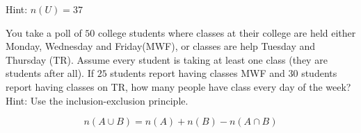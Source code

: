 \documentclass[addpoints,12pt]{exam}
\begin{document}
\begin{questions}
\begin{enumerate}[label = \alph*)]
			Hint: $n(U) = 37$
\end{enumerate}

\begin{center}
\end{center}


\newpage
\question You take a poll of $50 $ college students where classes at their college are held either Monday, Wednesday and Friday(MWF), or classes are help Tuesday and Thursday (TR). Assume every student is taking at least one class (they are students after all). If $25$ students report having classes MWF and $30$ students report having classes on TR, how many people have class every day of the week? Hint: Use the inclusion-exclusion principle. 


\begin{theorem}
		\[
		n(A\cup B) = n(A)+n(B)-n(A\cap B)
		\]
\end{theorem}




\end{questions}
\end{document}
